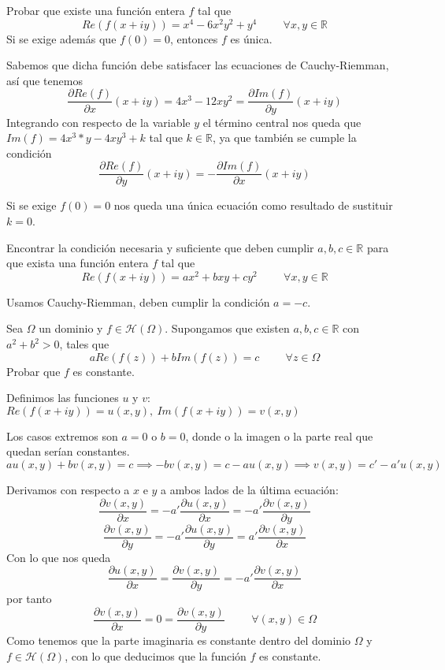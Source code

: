 \begin{ejer}
	Probar que existe una función entera $f$ tal que
	$$Re(f(x+iy)) = x^4-6x^2y^2+y^4 \hspace{1cm}\forall x,y\in\mathbb{R}$$
	Si se exige además que $f(0)=0$, entonces $f$ es única.
\end{ejer}
Sabemos que dicha función debe satisfacer las ecuaciones de Cauchy-Riemman, así que tenemos
$$ \frac{\partial Re(f)}{\partial x}(x+iy) = 4x^3-12xy^2 = \frac{\partial Im(f)}{\partial y}(x+iy) $$
Integrando con respecto de la variable $y$ el término central nos queda que
$Im(f) = 4x^3*y - 4xy^3+k$ tal que $k\in\mathbb{R}$, ya que también se cumple la condición 
$$ \frac{\partial Re(f)}{\partial y} (x+iy) = -\frac{\partial Im(f)}{\partial x} (x+iy) $$

Si se exige $f(0)=0$ nos queda una única ecuación como resultado de sustituir $k=0$.


\begin{ejer}
	Encontrar la condición necesaria y suficiente que deben cumplir $a,b,c\in\mathbb{R}$ para que exista una función entera $f$ tal que
	$$ Re(f(x+iy)) = ax^2+bxy+cy^2\hspace{1cm}\forall x,y\in\mathbb{R} $$
\end{ejer}
Usamos Cauchy-Riemman, deben cumplir la condición $a=-c$.


\begin{ejer}
	Sea $\Omega$ un dominio y $f\in\mathcal{H}(\Omega)$. Supongamos que existen $a,b,c\in\mathbb{R}$ con $a^2+b^2>0$, tales que
	$$ aRe(f(z)) + bIm(f(z)) = c\hspace{1cm} \forall z\in\Omega $$
	Probar que $f$ es constante.
\end{ejer}

\begin{sol}

Definimos las funciones $u$ y $v$: 
$Re(f(x+iy)) = u(x,y), \ Im(f(x+iy)) = v(x,y)$

Los casos extremos son $a=0$ o $b=0$, donde o la imagen o la parte real que quedan serían constantes.
$au(x,y)+bv(x,y)=c \implies -bv(x,y) = c-au(x,y) \implies v(x,y)= c'-a'u(x,y)$

Derivamos con respecto a $x$ e $y$ a ambos lados de la última ecuación:
$$\frac{\partial v(x,y)}{\partial x} = -a' \frac{\partial u(x,y)}{\partial x} = -a' \frac{\partial v(x,y)}{\partial y}$$
$$\frac{\partial v(x,y)}{\partial y} = -a' \frac{\partial u(x,y)}{\partial y} = a' \frac{\partial v(x,y)}{\partial x}$$
Con lo que nos queda
$$\frac{\partial u (x,y)}{\partial x} = \frac{\partial v(x,y)}{\partial y} = -a'\frac{\partial v(x,y)}{\partial x}$$
por tanto
$$\frac{\partial v(x,y)}{\partial x} = 0 = \frac{\partial v(x,y)}{\partial y} \hspace{1cm}\forall (x,y)\in\Omega$$
Como tenemos que la parte imaginaria es constante dentro del dominio $\Omega$ y $f\in\mathcal{H}(\Omega)$, con lo que deducimos que la función $f$ es constante.
\end{sol}



